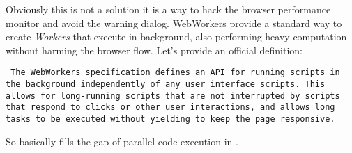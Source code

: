 	Obviously this is not a solution it is a way to hack the browser \js{} performance monitor and avoid the warning dialog.
	WebWorkers provide a standard way to create \emph{Workers} that execute in background, also performing heavy computation without harming
	the browser flow. Let's provide an official definition:
	\begin{quoting}\rm\tt
		The WebWorkers specification defines an API for running scripts in the background independently of any user interface scripts.
		This allows for long-running scripts that are not interrupted by scripts that respond to clicks or other user interactions,
		and allows long tasks to be executed without yielding to keep the page responsive.
	\end{quoting}

	So basically fills the gap of parallel code execution in \js{}.